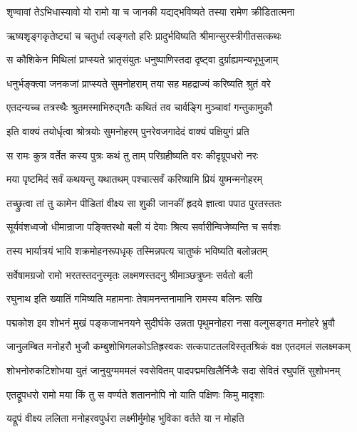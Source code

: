 \twolineshloka
{शृण्वावां तेऽभिधास्यावो यो रामो या च जानकी}
{यद्यद्भविष्यते तस्या रामेण क्रीडितात्मना}%

\twolineshloka
{ऋष्यशृङ्गकृतेष्ट्यां च चतुर्धा त्वङ्गतो हरिः}
{प्रादुर्भविष्यति श्रीमान्सुरस्त्रीगीतसत्कथः}%

\twolineshloka
{स कौशिकेन मिथिलां प्राप्स्यते भ्रातृसंयुतः}
{धनुष्पाणिस्तदा दृष्ट्वा दुर्ग्राह्यमन्यभूभुजाम्}%

\twolineshloka
{धनुर्भङ्क्त्वा जनकजां प्राप्स्यते सुमनोहराम्}
{तया सह महद्राज्यं करिष्यति श्रुतं वरे}%

\twolineshloka
{एतदन्यच्च तत्रस्थैः श्रुतमस्माभिरुद्गतैः}
{कथितं तव चार्वङ्गि मुञ्चावां गन्तुकामुकौ}%

\twolineshloka
{इति वाक्यं तयोर्धृत्वा श्रोत्रयोः सुमनोहरम्}
{पुनरेवजगादेदं वाक्यं पक्षियुगं प्रति}%

\twolineshloka
{स रामः कुत्र वर्तेत कस्य पुत्रः कथं तु ताम्}
{परिग्रहीष्यति वरः कीदृग्रूपधरो नरः}%

\twolineshloka
{मया पृष्टमिदं सर्वं कथयन्तु यथातथम्}
{पश्चात्सर्वं करिष्यामि प्रियं युष्मन्मनोहरम्}%

\twolineshloka
{तच्छ्रुत्वा तां तु कामेन पीडितां वीक्ष्य सा शुकी}
{जानकीं हृदये ज्ञात्वा पपाठ पुरतस्ततः}%

\twolineshloka
{सूर्यवंशध्वजो धीमान्राजा पङ्क्तिरथो बली}
{यं देवाः श्रित्य सर्वारीन्विजेष्यन्ति च सर्वशः}%

\twolineshloka
{तस्य भार्यात्रयं भावि शक्रमोहनरूपधृक्}
{तस्मिन्नपत्य चातुष्कं भविष्यति बलोन्नतम्}%

\twolineshloka
{सर्वेषामग्रजो रामो भरतस्तदनुस्मृतः}
{लक्ष्मणस्तदनु श्रीमाञ्छत्रुघ्नः सर्वतो बली}%

\twolineshloka
{रघुनाथ इति ख्यातिं गमिष्यति महामनाः}
{तेषामनन्तनामानि रामस्य बलिनः सखि}%

\fourlineindentedshloka
{पद्मकोश इव शोभनं मुखं}
{पङ्कजाभनयने सुदीर्घके}
{उन्नता पृथुमनोहरा नसा}
{वल्गुसङ्गत मनोहरे भ्रुवौ}%

\fourlineindentedshloka
{जानुलम्बित मनोहरौ भुजौ}
{कम्बुशोभिगलकोऽतिह्रस्वकः}
{सत्कपाटतलविस्तृतश्रिकं}
{वक्ष एतदमलं सलक्ष्मकम्}%

\fourlineindentedshloka
{शोभनोरुकटिशोभया युतं}
{जानुयुग्मममलं स्वसेवितम्}
{पादपद्ममखिलैर्निजैः सदा}
{सेवितं रघुपतिं सुशोभनम्}%

\twolineshloka
{एतद्रूपधरो रामो मया किं तु स वर्ण्यते}
{शताननोपि नो याति पक्षिणः किमु मादृशाः}%

\twolineshloka
{यद्रूपं वीक्ष्य ललिता मनोहरवपुर्धरा}
{लक्ष्मीर्मुमोह भुविका वर्तते या न मोहति}%

